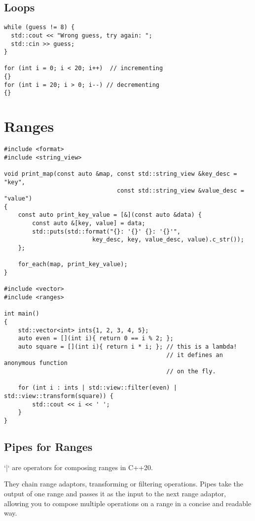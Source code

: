 \subsection{Loops}

\begin{verbatim}
while (guess != 8) {
  std::cout << "Wrong guess, try again: ";
  std::cin >> guess;
}

for (int i = 0; i < 20; i++)  // incrementing
{}
for (int i = 20; i > 0; i--) // decrementing
{}
\end{verbatim}

\section{Ranges}

\begin{verbatim}
#include <format>
#include <string_view>

void print_map(const auto &map, const std::string_view &key_desc = "key",
                                const std::string_view &value_desc = "value")
{
    const auto print_key_value = [&](const auto &data) { 
        const auto &[key, value] = data;
        std::puts(std::format("{}: '{}' {}: '{}'",
                         key_desc, key, value_desc, value).c_str());
    };

    for_each(map, print_key_value);
}

#include <vector>
#include <ranges>

int main()
{
    std::vector<int> ints{1, 2, 3, 4, 5};
    auto even = [](int i){ return 0 == i % 2; };
    auto square = [](int i){ return i * i; }; // this is a lambda!
                                              // it defines an anonymous function
                                              // on the fly.

    for (int i : ints | std::view::filter(even) | std::view::transform(square)) {
        std::cout << i << ' ';
    }
}
\end{verbatim}

\subsection{Pipes for Ranges}

`|` are operators for composing ranges in C++20.

They chain range adaptors, transforming or filtering operations.
Pipes take the output of one range and passes it as the input to the next range adaptor,
allowing you to compose multiple operations on a range in a concise and readable way.

